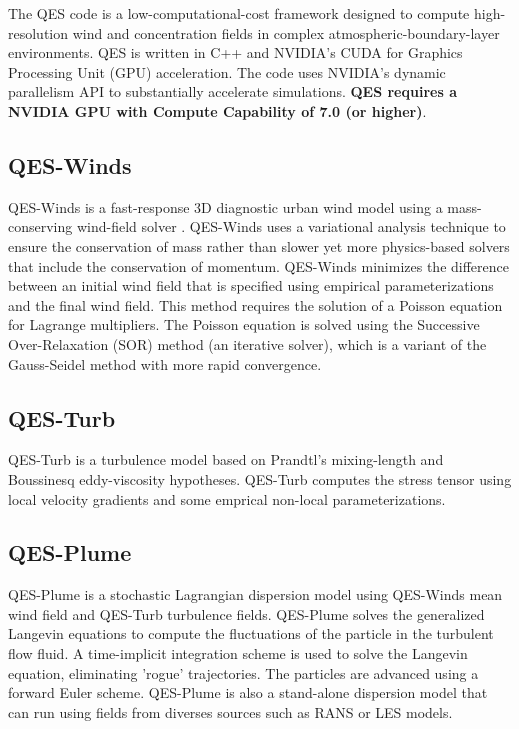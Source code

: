 \begin{itemize}
The QES code is a low-computational-cost framework designed to compute high-resolution wind and concentration fields in complex atmospheric-boundary-layer environments. QES is written in C++ and NVIDIA's CUDA for Graphics Processing Unit (GPU) acceleration. The code uses NVIDIA's dynamic parallelism API to substantially accelerate simulations. \textbf{QES requires a NVIDIA GPU with Compute Capability of 7.0 (or higher)}.


\subsection{QES-Winds}

QES-Winds is a fast-response 3D diagnostic urban wind model using a mass-conserving wind-field solver \cite{Bozorgmehr2021}. QES-Winds uses a variational analysis technique to ensure the conservation of mass rather than slower yet more physics-based solvers that include the conservation of momentum. QES-Winds minimizes the difference between an initial wind field that is specified using empirical parameterizations and the final wind field. This method requires the solution of a Poisson equation for Lagrange multipliers. The Poisson equation is solved using the Successive Over-Relaxation (SOR) method (an iterative solver), which is a variant of the Gauss-Seidel method with more rapid convergence.

\subsection{QES-Turb}

QES-Turb is a turbulence model based on Prandtl’s mixing-length and Boussinesq eddy-viscosity hypotheses. QES-Turb computes the stress tensor using local velocity gradients and some emprical non-local parameterizations.

\subsection{QES-Plume}

QES-Plume is a stochastic Lagrangian dispersion model using QES-Winds mean wind field and QES-Turb turbulence fields. QES-Plume solves the generalized Langevin equations to compute the fluctuations of the particle in the turbulent flow fluid. A time-implicit integration scheme is used to solve the Langevin equation, eliminating 'rogue' trajectories. The particles are advanced using a forward Euler scheme. QES-Plume is also a stand-alone dispersion model that can run using fields from diverses sources such as RANS or LES models.



\end{itemize}
